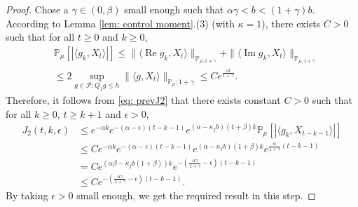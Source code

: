 \documentclass[12pt,a4paper]{amsart}
\theoremstyle{plain}
\theoremstyle{definition}
\numberwithin{equation}{section}
\begin{document}
\begin{proof}
    Chose a $\gamma\in(0,\beta)$ small enough such that $\alpha \gamma < b < (1+\gamma)b$.
    According to Lemma \ref{lem: control moment}.(3) (with $\kappa=1$), there exists $C>0$ such that for all $t\geq 0$ and $k\geq 0$,
\begin{equation}\begin{split}
    &\mathbb{P}_{\mu}\left[\left|\langle g_k,X_{t}\rangle\right|\right]
    \leq \|\langle \operatorname{Re} g_k, X_{t}\rangle\|_{\mathbb{P}_{\mu,1+\gamma}} + \|\langle \operatorname{Im} g_k, X_{t}\rangle\|_{\mathbb{P}_{\mu,1+\gamma}}
    \\& \leq 2\sup_{g\in \mathcal P: Q_1 g\leq h} \|\langle g, X_t\rangle\|_{\mathbb P_\mu; 1+\gamma} \leq C e^{\frac{\alpha t}{1+\gamma}}.
\end{split}\end{equation}
    Therefore, it follows from \eqref{eq: prevJ2} that there exists constant $C>0$ such that for all $k\geq 0$, $t\geq k+1$ and $\epsilon> 0$,
\begin{equation}\begin{split}
\label{eq: right bound for J2}
    J_2(t,k, \epsilon)&
    \leq  e^{-\alpha k}e^{-(\alpha-\epsilon)(t-k-1)}e^{(\alpha-\kappa_f b)(1+\beta)k} \mathbb{P}_{\mu}\left[\left|\langle g_k,X_{t-k-1}\rangle\right|\right]
    \\&\leq C e^{-\alpha k}e^{-(\alpha-\epsilon)(t-k-1)}e^{(\alpha-\kappa_f b)(1+\beta)k} e^{\frac{\alpha}{1+\gamma}(t-k-1)}
    \\&= C e^{(\alpha \beta - \kappa_f b(1+\beta))k}e^{-(\frac{\alpha\gamma}{1+\gamma}-\epsilon)(t-k-1)}
    \\&\leq C e^{-(\frac{\alpha\gamma}{1+\gamma}-\epsilon)(t-k-1)}.
\end{split}\end{equation}
    By taking $\epsilon >0$ small enough, we get the required result in this step.


\end{proof}
\end{document}
